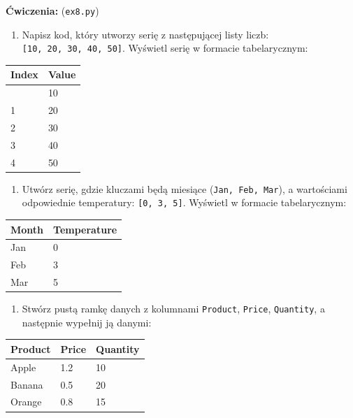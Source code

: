 \documentclass[
  polish,
  letterpaper,
  DIV=11,
  numbers=noendperiod]{scrreprt}
\providecommand{\tightlist}{%
  \setlength{\itemsep}{0pt}\setlength{\parskip}{0pt}}
\begin{document}
\textbf{Ćwiczenia:} (\texttt{ex8.py})

\begin{enumerate}
\def\labelenumi{\arabic{enumi}.}
\tightlist
\item
  Napisz kod, który utworzy serię z następującej listy liczb:
  \texttt{{[}10,\ 20,\ 30,\ 40,\ 50{]}}. Wyświetl serię w formacie
  tabelarycznym:
\end{enumerate}

\begin{longtable}[]{@{}ll@{}}
\toprule\noalign{}
Index & Value \\
\midrule\noalign{}
\endhead
\bottomrule\noalign{}
\endlastfoot
0 & 10 \\
1 & 20 \\
2 & 30 \\
3 & 40 \\
4 & 50 \\
\end{longtable}

\begin{enumerate}
\def\labelenumi{\arabic{enumi}.}
\setcounter{enumi}{1}
\tightlist
\item
  Utwórz serię, gdzie kluczami będą miesiące
  (\texttt{\textquotesingle{}Jan\textquotesingle{},\ \textquotesingle{}Feb\textquotesingle{},\ \textquotesingle{}Mar\textquotesingle{}}),
  a wartościami odpowiednie temperatury: \texttt{{[}0,\ 3,\ 5{]}}.
  Wyświetl w formacie tabelarycznym:
\end{enumerate}

\begin{longtable}[]{@{}ll@{}}
\toprule\noalign{}
Month & Temperature \\
\midrule\noalign{}
\endhead
\bottomrule\noalign{}
\endlastfoot
Jan & 0 \\
Feb & 3 \\
Mar & 5 \\
\end{longtable}

\begin{enumerate}
\def\labelenumi{\arabic{enumi}.}
\setcounter{enumi}{2}
\tightlist
\item
  Stwórz pustą ramkę danych z kolumnami \texttt{Product},
  \texttt{Price}, \texttt{Quantity}, a następnie wypełnij ją danymi:
\end{enumerate}

\begin{longtable}[]{@{}lll@{}}
\toprule\noalign{}
Product & Price & Quantity \\
\midrule\noalign{}
\endhead
\bottomrule\noalign{}
\endlastfoot
Apple & 1.2 & 10 \\
Banana & 0.5 & 20 \\
Orange & 0.8 & 15 \\
\end{longtable}
\end{document}
